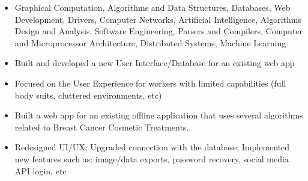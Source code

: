 \documentclass[10pt,a4paper]{altacv}
\begin{document}

\begin{fullwidth}
\makecvheader
\end{fullwidth}

\begin{itemize}
    \item Graphical Computation, Algorithms and Data Structures, Databases, Web Development, Drivers, Computer Networks, Artificial Intelligence, Algorithms Design and Analysis, Software Engineering, Parsers and Compilers, Computer and Microprocessor Architecture, Distributed Systems, Machine Learning
\end{itemize}


\begin{itemize}
\item Built and developed a new User Interface/Database for an existing web app
\item Focused on the User Experience for workers with limited capabilities (full body suits, cluttered environments, etc)
\end{itemize}

\vspace{2mm}

\begin{itemize}
\item Built a web app for an existing offline application that uses several algorithms related to Breast Cancer Cosmetic Treatments.
\item Redesigned UI/UX; Upgraded connection with the database; Implemented new features such as: image/data exports, password recovery, social media API login, etc

\end{itemize}
\end{document}
